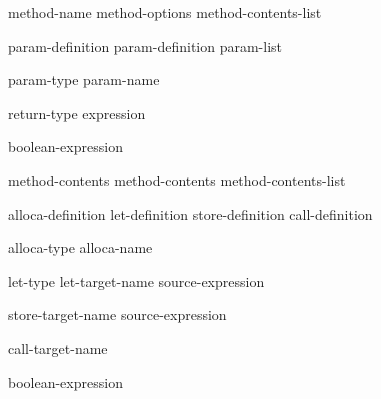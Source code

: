 \begin{bnf}
\br
     method-name method-options \terminal{\{} method-contents-list \terminal{\}}

\br
      

\br
    param-definition\br
    param-definition \terminal{,} param-list

\br
    param-type param-name

\br
    return-type \terminal{=} expression

\br
     boolean-expression

\br
    method-contents\br
    method-contents method-contents-list

\br
    alloca-definition\br
    let-definition\br
    store-definition\br
    call-definition

\br
     alloca-type alloca-name

\br
     let-type  \terminal{:} let-target-name \terminal{=} source-expression

\br
      \terminal{:} store-target-name \terminal{=} source-expression

\br
       \terminal{:} call-target-name 

\br
    \terminal{(} boolean-expression \terminal{)}

\end{bnf}
